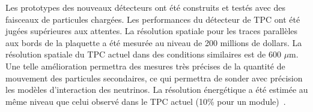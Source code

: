 \documentclass[../main.tex]{subfiles}
\begin{document}

Les prototypes des nouveaux détecteurs ont été construits et testés avec des faisceaux de particules chargées. Les performances du détecteur de TPC ont été jugées supérieures aux attentes. La résolution spatiale pour les traces parallèles aux bords de la plaquette a été mesurée au niveau de 200 millions de dollars. La résolution spatiale du TPC actuel dans des conditions similaires est de 600 $\mu$m. Une telle amélioration permettra des mesures très précises de la quantité de mouvement des particules secondaires, ce qui permettra de sonder avec précision les modèles d'interaction des neutrinos. La résolution énergétique a été estimée au même niveau que celui observé dans le TPC actuel (10\% pour un module)~\cite{Attie2019b}.

\end{document}
